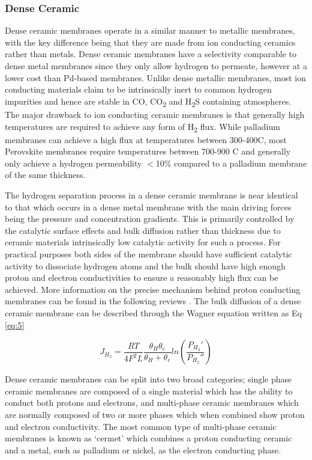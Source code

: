 \subsubsection{Dense Ceramic}
Dense ceramic membranes operate in a similar manner to metallic membranes, with the key 
difference being that they are made from ion conducting ceramics rather than metals. 
Dense ceramic membranes have a selectivity comparable to dense metal membranes since they 
only allow hydrogen to permeate, however at a lower cost than Pd-based membranes. 
Unlike dense metallic membranes, most ion conducting materials claim to be intrinsically 
inert to common hydrogen impurities and hence are stable in CO, CO\textsubscript{2} 
and H\textsubscript{2}S containing atmospheres. \cite{NathanW.Ockwig2007a} The major drawback to ion conducting ceramic
membranes is that generally high temperatures are required to achieve any form of 
H\textsubscript{2} flux. While palladium membranes can achieve a high flux at temperatures 
between 300-400\textdegree C, most Perovskite membranes require temperatures between 700-900\textdegree 
C and generally only achieve a hydrogen permeability $<$10\% compared to a palladium 
membrane of the same thickness.  

The hydrogen separation process in a dense ceramic membrane is near identical to that which 
occurs in a dense metal membrane with the main driving forces being the pressure and 
concentration gradients. This is primarily controlled by the catalytic surface effects and 
bulk diffusion rather than thickness due to ceramic materials intrinsically low catalytic 
activity for such a process. For practical purposes both sides of the membrane should have 
sufficient catalytic activity to dissociate hydrogen atoms and the bulk should have high 
enough proton and electron conductivities to ensure a reasonably high flux can be achieved. 
More information on the precise mechanism behind proton conducting membranes can be found in 
the following reviews \cite{Tao2015, Phair2006}. The bulk diffusion of a dense ceramic membrane can be 
described through the Wagner equation written as Eq \ref{eq:5}

\begin{equation} \label{eq:5}
    J_{H_2} = \frac{RT}{4F^2L} \frac{\theta_H \theta_e}{\theta_H + \theta_e} ln \left(\frac{P_{H_2}'}{P_{H_2}''} \right)
\end{equation}
\renewcommand{\bibname}{References}

Dense ceramic membranes can be split into two broad categories; single phase ceramic 
membranes are composed of a single material which has the ability to conduct both protons 
and electrons, and multi-phase ceramic membranes which are normally composed of two or more 
phases which when combined show proton and electron conductivity. The most common type of 
multi-phase ceramic membranes is known as ‘cermet’ which combines a proton conducting ceramic 
and a metal, such as palladium or nickel, as the electron conducting phase.

